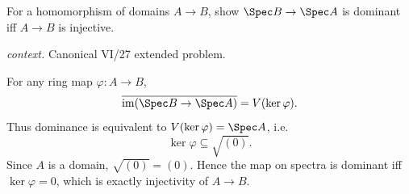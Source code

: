 \begin{problem}\label{prob:vi27-p13}
For a homomorphism of domains \(A\to B\), show \(\Spec B\to\Spec A\) is dominant iff \(A\to B\) is injective.
\par\smallskip\noindent\textit{context.} Canonical VI/27 extended problem.
\end{problem}

\ifdefined\FullProblemDossiers
\begin{solution}
For any ring map \(\varphi:A\to B\),
\[
\overline{\operatorname{im}(\Spec B\to\Spec A)}=V(\ker\varphi).
\]
Thus dominance is equivalent to \(V(\ker\varphi)=\Spec A\), i.e.
\[
\ker\varphi\subseteq\sqrt{(0)}.
\]
Since \(A\) is a domain, \(\sqrt{(0)}=(0)\). Hence the map on spectra is dominant iff \(\ker\varphi=0\), which is
exactly injectivity of \(A\to B\).
\end{solution}
\fi
